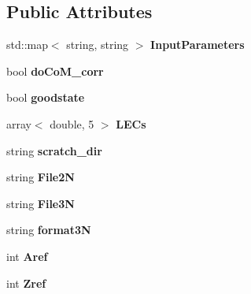 \subsection*{Public Attributes}
\begin{DoxyCompactItemize}
\item 
std\+::map$<$ string, string $>$ {\bfseries Input\+Parameters}\hypertarget{classReadWrite_aa99ba50a35d8391285c1bdde1f1c206d}{}\label{classReadWrite_aa99ba50a35d8391285c1bdde1f1c206d}

\item 
bool {\bfseries do\+Co\+M\+\_\+corr}\hypertarget{classReadWrite_a3221f4b824dc385b066eca732339ee72}{}\label{classReadWrite_a3221f4b824dc385b066eca732339ee72}

\item 
bool {\bfseries goodstate}\hypertarget{classReadWrite_aaf2753e15a5e7f524d6fde9f15ab357b}{}\label{classReadWrite_aaf2753e15a5e7f524d6fde9f15ab357b}

\item 
array$<$ double, 5 $>$ {\bfseries L\+E\+Cs}\hypertarget{classReadWrite_a98868a5ad922435a81990dc2cb8db4d0}{}\label{classReadWrite_a98868a5ad922435a81990dc2cb8db4d0}

\item 
string {\bfseries scratch\+\_\+dir}\hypertarget{classReadWrite_ad561dc713d8daa4a7438e636a9c2da8c}{}\label{classReadWrite_ad561dc713d8daa4a7438e636a9c2da8c}

\item 
string {\bfseries File2N}\hypertarget{classReadWrite_a2dadd983281d5b8451500ff3bb79150a}{}\label{classReadWrite_a2dadd983281d5b8451500ff3bb79150a}

\item 
string {\bfseries File3N}\hypertarget{classReadWrite_ae82a432e5604c503e206d40843e44b87}{}\label{classReadWrite_ae82a432e5604c503e206d40843e44b87}

\item 
string {\bfseries format3N}\hypertarget{classReadWrite_aa7b2ebd186e55bcab6b526e0780e9352}{}\label{classReadWrite_aa7b2ebd186e55bcab6b526e0780e9352}

\item 
int {\bfseries Aref}\hypertarget{classReadWrite_aca5f0cb236385d203bee1161f36d13a4}{}\label{classReadWrite_aca5f0cb236385d203bee1161f36d13a4}

\item 
int {\bfseries Zref}\hypertarget{classReadWrite_a1d6ac500b2e1e8f76c8df799a114120f}{}\label{classReadWrite_a1d6ac500b2e1e8f76c8df799a114120f}

\end{DoxyCompactItemize}


